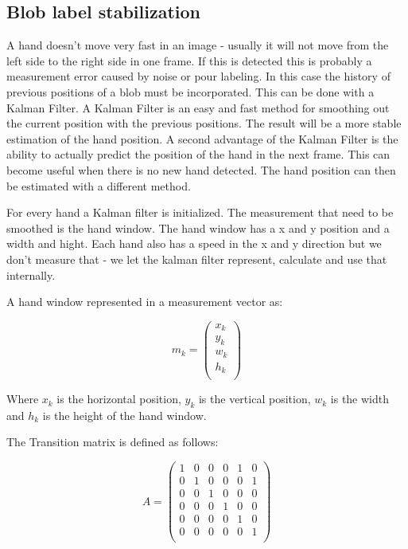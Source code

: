 \subsection*{Blob label stabilization}
A hand doesn't move very fast in an image - usually it will not move from the left side to the right side in one frame. If this is detected this is probably a measurement error caused by noise or pour labeling. In this case the history of previous positions of a blob must be incorporated. This can be done with a Kalman Filter. A Kalman Filter is an easy and fast method for smoothing out the current position with the previous positions. The result will be a more stable estimation of the hand position. A second advantage of the Kalman Filter is the ability to actually predict the position of the hand in the next frame. This can become useful when there is no new hand detected. The hand position can then be estimated with a different method.

For every hand a Kalman filter is initialized. The measurement that need to be smoothed is the hand window. The hand window has a x and y position and a width and hight. Each hand also has a speed in the x and y direction but we don't measure that - we let the kalman filter represent, calculate and use that internally. 

A hand window represented in a measurement vector as:

\begin{equation}
 m_k = \left(
\begin{array}{c}
	x_k \\ %
	y_k \\ %
	w_k \\ %
	h_k \\ %
\end{array} \right)
\end{equation}

Where $x_k$ is the horizontal position, $y_k$ is the vertical position, $w_k$ is the width and $h_k$ is the height of the hand window.

The Transition matrix is defined as follows:

\begin{equation}
 A = \left(
\begin{array}{cccccc}
	1 & 0 & 0 & 0 & 1 & 0 \\
	0 & 1 & 0 & 0 & 0 & 1 \\
	0 & 0 & 1 & 0 & 0 & 0 \\
	0 & 0 & 0 & 1 & 0 & 0 \\
	0 & 0 & 0 & 0 & 1 & 0 \\
	0 & 0 & 0 & 0 & 0 & 1 \\
\end{array} \right)
\end{equation}
	
